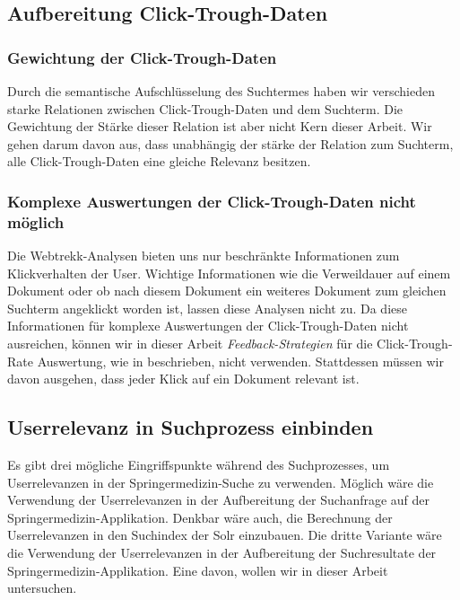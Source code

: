 \subsection{Aufbereitung Click-Trough-Daten}
\label{sec:Reranking:Methodik:Click-Trough-Daten}

\subsubsection{Gewichtung der Click-Trough-Daten}
\label{sec:Reranking:Methodik:Click-Trough-Daten:Gewichtung}

Durch die semantische Aufschlüsselung des Suchtermes haben wir verschieden starke Relationen zwischen Click-Trough-Daten und dem Suchterm. Die Gewichtung der Stärke dieser Relation ist aber nicht Kern dieser Arbeit. Wir gehen darum davon aus, dass unabhängig der stärke der Relation zum Suchterm, alle Click-Trough-Daten eine gleiche Relevanz besitzen.

\subsubsection{Komplexe Auswertungen der Click-Trough-Daten nicht möglich}
\label{sec:Reranking:Methodik:Click-Trough-Daten:Click-Trough-DatenAuswertungen}

Die Webtrekk-Analysen bieten uns nur beschränkte Informationen zum Klickverhalten der User. Wichtige Informationen wie die Verweildauer auf einem Dokument oder ob nach diesem Dokument ein weiteres Dokument zum gleichen Suchterm angeklickt worden ist, lassen diese Analysen nicht zu. Da diese Informationen für komplexe Auswertungen der Click-Trough-Daten nicht ausreichen, können wir in dieser Arbeit \textit{Feedback-Strategien} für die Click-Trough-Rate Auswertung, wie in \cite{Joachims} beschrieben, nicht verwenden. Stattdessen müssen wir davon ausgehen, dass jeder Klick auf ein Dokument relevant ist.

\subsection{Userrelevanz in Suchprozess einbinden}
\label{sec:Reranking:Methodik:SucheEinbinden}

Es gibt drei mögliche Eingriffspunkte während des Suchprozesses, um Userrelevanzen in der Springermedizin-Suche zu verwenden. Möglich wäre die Verwendung der Userrelevanzen in der Aufbereitung der Suchanfrage auf der Springermedizin-Applikation. Denkbar wäre auch, die Berechnung der Userrelevanzen in den Suchindex der Solr einzubauen. Die dritte Variante wäre die Verwendung der Userrelevanzen in der Aufbereitung der Suchresultate der Springermedizin-Applikation. Eine davon, wollen wir in dieser Arbeit untersuchen. 

